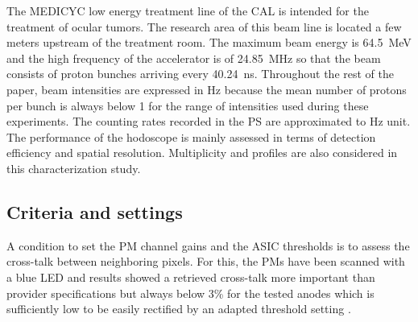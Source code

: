 \documentclass[a4paper,11pt]{article}
\begin{document}
The MEDICYC low energy treatment line of the CAL is intended for the treatment of ocular tumors. The research area of this beam line is located a few meters upstream of the treatment room. The maximum beam energy is 64.5~MeV and the high frequency of the accelerator is of 24.85~MHz so that the beam consists of proton bunches arriving every 40.24~ns. Throughout the rest of the paper, beam intensities are expressed in Hz because the mean number of protons per bunch is always below 1 for the range of intensities used during these experiments. The counting rates recorded in the PS are approximated to Hz unit.
The performance of the hodoscope is mainly assessed in terms of detection efficiency and spatial resolution. Multiplicity and profiles are also considered in this characterization study.

\subsection{Criteria and settings}
\label{Settings}

A condition to set the PM channel gains and the ASIC thresholds is to assess the cross-talk between neighboring pixels. For this, the PMs have been scanned with a blue LED and results showed a retrieved cross-talk more important than provider specifications but always below 3\% for the tested anodes which is sufficiently low to be easily rectified by an adapted threshold setting \cite{FontanaPhD}.
\end{document}
